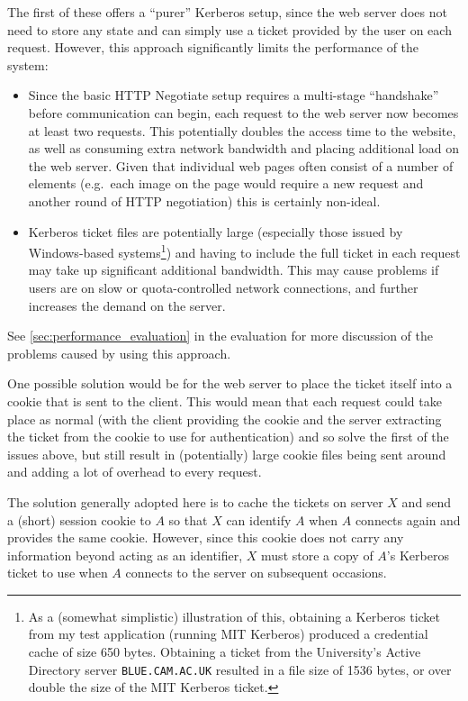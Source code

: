 \documentclass[12pt]{report}
\begin{document}
The first of these offers a ``purer'' Kerberos setup, since the web server does not need to store any state and can simply use a ticket provided by the user on each request. However, this approach significantly limits the performance of the system:
\begin{itemize}
\item
  Since the basic HTTP Negotiate setup requires a multi-stage ``handshake'' before communication can begin, each request to the web server now becomes at least two requests. This potentially doubles the access time to the website, as well as consuming extra network bandwidth and placing additional load on the web server. Given that individual web pages often consist of a number of elements (e.g.\ each image on the page would require a new request and another round of HTTP negotiation) this is certainly non-ideal.
\item
  Kerberos ticket files are potentially large (especially those issued by Windows-based systems\footnote{As a (somewhat simplistic) illustration of this, obtaining a Kerberos ticket from my test application (running MIT Kerberos) produced a credential cache of size 650 bytes. Obtaining a ticket from the University's Active Directory server \texttt{BLUE.CAM.AC.UK} resulted in a file size of 1536 bytes, or over double the size of the MIT Kerberos ticket.}) and having to include the full ticket in each request may take up significant additional bandwidth. This may cause problems if users are on slow or quota-controlled network connections, and further increases the demand on the server.
\end{itemize}

See \autoref{sec:performance_evaluation} in the evaluation for more discussion of the problems caused by using this approach.

One possible solution would be for the web server to place the ticket itself into a cookie that is sent to the client. This would mean that each request could take place as normal (with the client providing the cookie and the server extracting the ticket from the cookie to use for authentication) and so solve the first of the issues above, but still result in (potentially) large cookie files being sent around and adding a lot of overhead to every request.

The solution generally adopted here is to cache the tickets on server $X$ and send a (short) session cookie to $A$ so that $X$ can identify $A$ when $A$ connects again and provides the same cookie. However, since this cookie does not carry any information beyond acting as an identifier, $X$ must store a copy of $A$'s Kerberos ticket to use when $A$ connects to the server on subsequent occasions.
\end{document}
